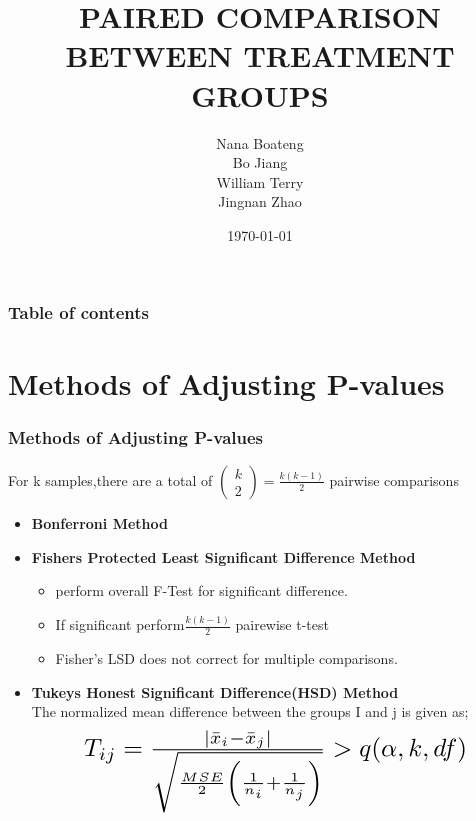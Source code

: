 \documentclass[hyperref={pdfpagelabels=false}]{beamer}
\title{PAIRED    COMPARISON BETWEEN  TREATMENT  GROUPS}
\author{Nana Boateng \\
 Bo Jiang\\
 William Terry \\
Jingnan Zhao}
\date{\today}
\begin{document}
\begin{frame}
\titlepage
\end{frame} 

\begin{frame}
\frametitle{Table of contents}
\tableofcontents
\end{frame}
 


\section{Methods of Adjusting P-values} 


\begin{frame}
\frametitle{\textbf{Methods of Adjusting P-values}}
For k samples,there are a total of $\left( 
\begin{array}{c} 
k\\ 
2 
\end{array} 
\right) =\frac{k(k-1)}{2}$ 
pairwise comparisons
\pause
\begin{itemize}
\item\textbf{\color{blue} Bonferroni Method}\\


\pause
\item\textbf{\color{blue} Fishers Protected Least Significant Difference Method}\\
\begin{itemize}
\item perform overall F-Test for significant difference.
\item If significant perform$ \frac{k(k-1)}{2}$ pairewise t-test
\item Fisher's LSD does not correct for multiple comparisons.
\end{itemize}
\end{itemize}
\end{frame}	

\begin{frame}
\begin{itemize}

\item\textbf{\color{blue} Tukeys  Honest Significant Difference(HSD) Method}\\
The normalized mean difference between the groups I and j is given as;
\pause
 \begin{equation*}
\scalebox{1.8}{
$T _{ij}=\frac{|\bar{x}_{i}-\bar{x}_{j}|}{\sqrt{\frac{MSE}{2}\left(\frac{1}{n_{i}}+\frac{1}{n_{j}}\right)}}>q(\alpha,k,df)$}
\end{equation*}
\end{itemize}
\end{frame}
\end{document}
